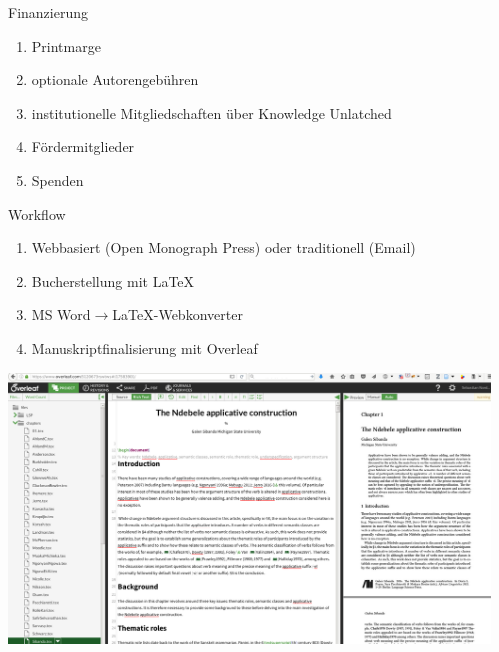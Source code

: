 \documentclass[final,utf8]{beamer}
\begin{document}
\begin{frame}{}
\begin{columns}[t]
\begin{column}{.45\linewidth}
    \begin{block}{Finanzierung} 
	\begin{enumerate} 
	    \item Printmarge
	    \item optionale Autorengebühren
	    \item institutionelle Mitgliedschaften über Knowledge Unlatched
	    \item Fördermitglieder
	    \item Spenden
	\end{enumerate}  
    \end{block} 



    \begin{block}{Workflow} 
	\begin{enumerate} 
	    \item Webbasiert (Open Monograph Press) oder traditionell (Email)
	    \item Bucherstellung mit {\LaTeX}
	    \item MS Word$\to${\LaTeX}-Webkonverter
	    \item Manuskriptfinalisierung mit Overleaf
	\end{enumerate}  
     \includegraphics[width=.9\textwidth]{overleaf.png}
  
    \end{block} 

 

 

  \end{column}


  \begin{column}{.45\linewidth}
    

\end{column}
\end{columns}
\end{frame}
\end{document}
